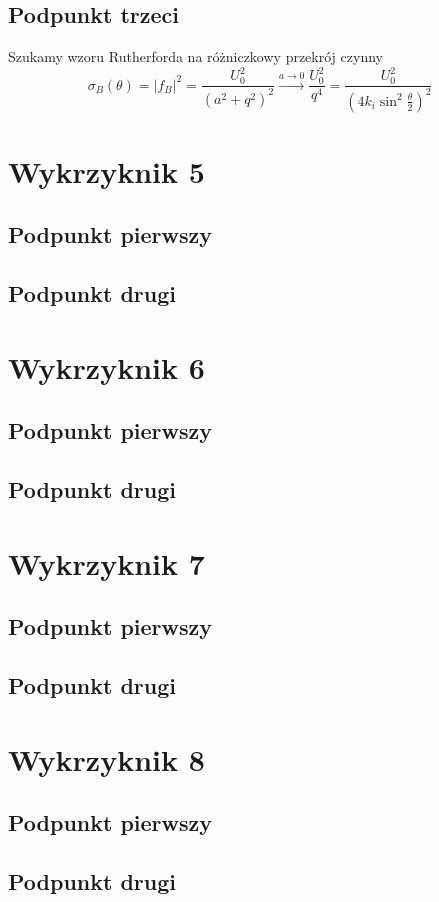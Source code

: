 \documentclass[a4paper,12pt]{article}
\begin{document}
    	\subsection{Podpunkt trzeci}
    	Szukamy wzoru Rutherforda na różniczkowy przekrój czynny
    	$$
    	\sigma_B(\theta) = |f_B|^2 = \frac{U_0^2}{(a^2+q^2)^2} \overset{a\to 0}{\to} \frac{U_0^2}{q^4} = \frac{U_0^2}{(4k_i\sin^2\frac{\theta}{2})^2}
    	$$
    \section{Wykrzyknik 5}
    	\subsection{Podpunkt pierwszy}
    	\subsection{Podpunkt drugi}
    \section{Wykrzyknik 6}
    	\subsection{Podpunkt pierwszy}
    	\subsection{Podpunkt drugi}
    \section{Wykrzyknik 7}
    	\subsection{Podpunkt pierwszy}
    	\subsection{Podpunkt drugi}
    \section{Wykrzyknik 8}
    	\subsection{Podpunkt pierwszy}
    	\subsection{Podpunkt drugi}
\end{document}
